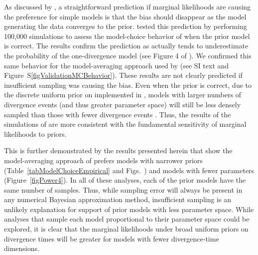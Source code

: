 As discussed by \citet{Oaks2012}, a straightforward prediction if marginal
likelihoods are causing the preference for simple models is that the bias should
disappear as the model generating the data converges to the prior.
\citet{Oaks2012} tested this prediction by performing 100,000 simulations to
assess the model-choice behavior of \msb when the prior model is correct.
The results confirm the prediction as \msb actually tends to underestimate
the probability of the one-divergence model (see Figure 4 of
\citet{Oaks2012}).
We confirmed this same behavior for the model-averaging approach used by
\citet{Hickerson2013} (see SI text and Figure~S\ref{figValidationMCBehavior}).
These results are not clearly predicted if insufficient sampling was causing
the bias.
Even when the prior is correct, due to the discrete uniform prior on
\numt{} implemented in \msb, models with larger numbers of divergence
events (and thus greater parameter space) will still be less densely
sampled than those with fewer divergence events \citep{Oaks2012}.
Thus, the results of the simulations of \citet{Oaks2012} are more consistent
with the fundamental sensitivity of marginal likelihoods to priors.

This is further demonstrated by the results presented herein that show the
model-averaging approach of \citet{Hickerson2013} prefers models with narrower
\divt{} priors (Table~\ref{tabModelChoiceEmpirical} and
Figs.~)
and models with fewer \divt{} parameters (Figure~\ref{figPower4}).
In all of these analyses, each of the prior models have the same number of
samples.
Thus, while sampling error will always be present in any numerical Bayesian
approximation method, insufficient sampling is an unlikely explanation for
support of prior models with less parameter space.
While analyses that sample each model proportional to their parameter space
could be explored, it is clear that the marginal likelihoods under broad
uniform priors on divergence times will be greater for models with fewer
divergence-time dimensions.




